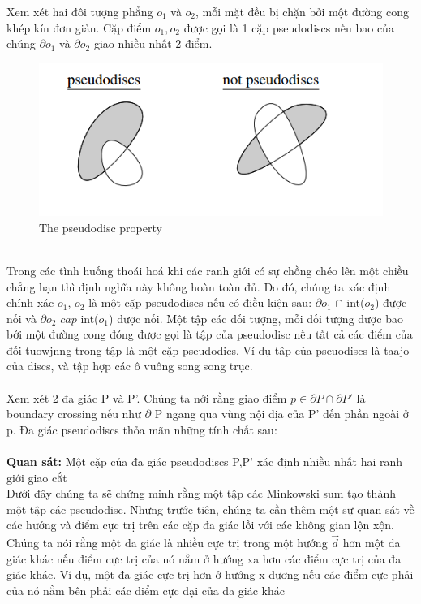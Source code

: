 \documentclass[a4paper,12pt]{report}
\begin{document}
Xem xét hai đôi tượng phẳng $o_1$ và $o_2$, mỗi mặt đều bị chặn bởi một đường cong khép kín đơn giản. Cặp điểm $o_1, o_2$ được gọi là 1 cặp pseudodiscs nếu bao của chúng $\partial o_1$ và $\partial o_2$ giao nhiều nhất 2 điểm.\\
\begin{figure}[h]
\begin{center}
\includegraphics[width=0.5\linewidth]{6.png}
\caption{The pseudodisc property}
\end{center}
\end{figure} \\
Trong các tình huống thoái hoá khi các ranh giới có sự chồng chéo lên một chiều chẳng hạn thì định nghĩa này không hoàn toàn đủ. Do đó, chúng ta xác định chính xác $o_1$, $o_2$ là một cặp pseudodiscs nếu có điều kiện sau: $\partial o_1$ $\cap$ int($o_2$) được nối và $\partial o_2$ $cap$ int($o_1$) được nối. Một tập các đối tượng, mỗi đối tượng được bao bới một đường cong đóng được gọi là tập của pseudodisc nếu tất cả các điểm của đối tuowjnng trong tập là một cặp pseudodics. Ví dụ tâp của pseuodiscs là taajo của discs, và tập hợp các ô vuông song song trục.\\  \\
Xem xét 2 đa giác P và P'. Chúng ta nới rằng giao điểm $p \in \partial P \cap \partial P'$ là boundary crossing nếu như $\partial $ P ngang qua vùng nội địa của P' đến phần ngoài ở p. Đa giác pseudodiscs thỏa mãn những tính chất sau:\\ \\
\textbf{Quan sát: }Một cặp của đa giác pseudodiscs P,P' xác định nhiều nhất hai ranh giới giao cắt  \\
Dưới đây chúng ta sẽ chứng minh rằng một  tập các  Minkowski sum tạo thành một tập các pseudodisc. Nhưng trước tiên, chúng ta cần thêm một sự quan sát về các hướng và điểm cực trị trên các cặp đa giác lồi với các không gian lộn xộn. Chúng ta nói rằng một đa giác là nhiều cực trị  trong một hướng $\overrightarrow{d}$ hơn một đa giác khác nếu điểm cực trị của nó nằm ở hướng xa hơn các điểm cực trị của đa giác khác. Ví dụ, một đa giác cực trị hơn ở hướng x dương nếu các điểm cực phải của nó nằm bên phải các điểm cực đại của đa giác khác \\ \\
\end{document}
